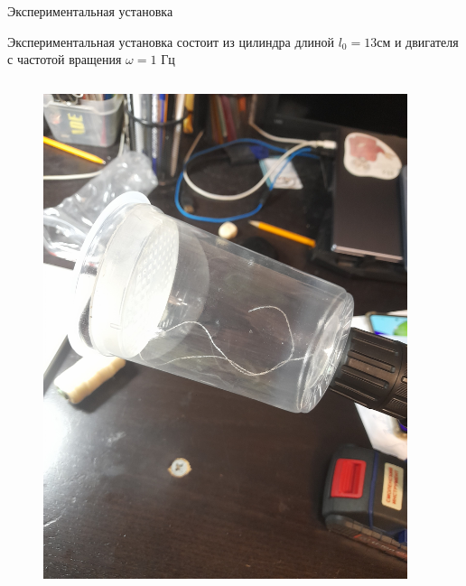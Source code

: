 \begin{frame}{Экспериментальная установка}

	\begin{block}{}
		Экспериментальная установка состоит из цилиндра длиной $l_0 = 13$см и двигателя с частотой вращения $\omega = 1 $ Гц
	\end{block}

	\begin{columns}

		\begin{column}{0.4\linewidth}
			\begin{figure}[H]
				\includegraphics[width=1\linewidth]{img/experiment.jpg}
			\end{figure}

		\end{column}

		\begin{column}{0.6\linewidth}


\end{column}
\end{columns}
\end{frame}

